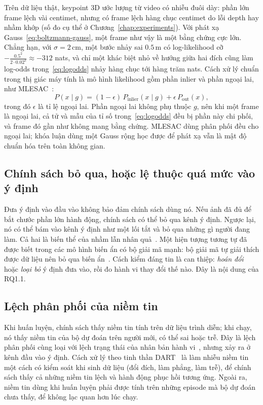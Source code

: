 Trên dữ liệu thật, keypoint 3D ước lượng từ video có nhiễu đuôi dày: phần lớn frame lệch vài centimet, nhưng có frame lệch hàng chục centimet do lỗi depth hay nhầm khớp (số đo cụ thể ở Chương~\ref{chap:experiments}). Với phát xạ Gauss~\eqref{eq:boltzmann-gauss}, một frame như vậy là một bằng chứng cực lớn. Chẳng hạn, với $\sigma=2$\,cm, một bước nhảy sai $0.5$\,m có log-likelihood cỡ $-\frac{0.5^2}{2\cdot0.02^2}\approx-312$ nats, và chỉ một khác biệt nhỏ về hướng giữa hai đích cũng làm log-odds trong~\eqref{eq:logodds} nhảy hàng chục tới hàng trăm nats. Cách xử lý chuẩn trong thị giác máy tính là mô hình likelihood gồm phần inlier và phần ngoại lai, như MLESAC~\cite{torr2000mlesac}:
\begin{equation}
  P(x\mid g)=(1-\epsilon)\,P_{\text{inlier}}(x\mid g)+\epsilon\,P_{\text{out}}(x),
  \label{eq:robust}
\end{equation}
trong đó $\epsilon$ là tỉ lệ ngoại lai. Phần ngoại lai không phụ thuộc $g$, nên khi một frame là ngoại lai, cả tử và mẫu của tỉ số trong~\eqref{eq:logodds} đều bị phần này chi phối, và frame đó gần như không mang bằng chứng. MLESAC dùng phân phối đều cho ngoại lai; khóa luận dùng một Gauss rộng học được để phát xạ vẫn là mật độ chuẩn hóa trên toàn không gian.

\subsection{Chính sách bỏ qua, hoặc lệ thuộc quá mức vào ý định}

Đưa ý định vào đầu vào không bảo đảm chính sách dùng nó. Nếu ảnh đã đủ để bắt chước phần lớn hành động, chính sách có thể bỏ qua kênh ý định. Ngược lại, nó có thể bám vào kênh ý định như một lối tắt và bỏ qua những gì người đang làm. Cả hai là biến thể của nhầm lẫn nhân quả~\cite{dehaan2019causal}. Một hiện tượng tương tự đã được biết trong các mô hình biến ẩn có bộ giải mã mạnh: bộ giải mã tự giải thích được dữ liệu nên bỏ qua biến ẩn~\cite{bowman2016generating,chen2017vlae}. Cách kiểm đáng tin là can thiệp: \emph{hoán đổi} hoặc \emph{loại bỏ} ý định đưa vào, rồi đo hành vi thay đổi thế nào. Đây là nội dung của RQ1.1.

\subsection{Lệch phân phối của niềm tin}

Khi huấn luyện, chính sách thấy niềm tin tính trên dữ liệu trình diễn; khi chạy, nó thấy niềm tin của bộ dự đoán trên người mới, có thể sai hoặc trễ. Đây là lệch phân phối cùng loại với lệch trạng thái của nhân bản hành vi~\cite{ross2011dagger}, nhưng xảy ra ở kênh đầu vào ý định. Cách xử lý theo tinh thần DART~\cite{laskey2017dart} là làm nhiễu niềm tin một cách có kiểm soát khi sinh dữ liệu (đổi đích, làm phẳng, làm trễ), để chính sách thấy cả những niềm tin lệch và hành động phục hồi tương ứng. Ngoài ra, niềm tin dùng khi huấn luyện phải được tính trên những episode mà bộ dự đoán chưa thấy, để không lạc quan hơn lúc chạy.

